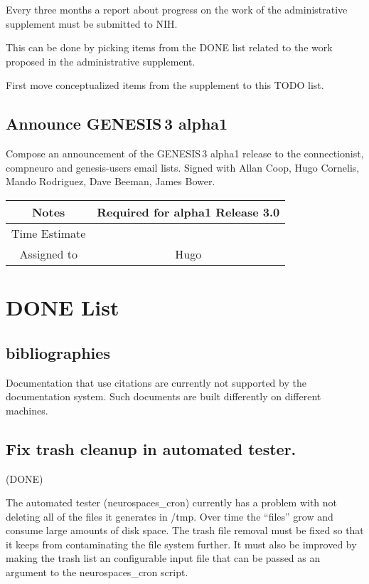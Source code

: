 \documentclass[12pt]{article}
\begin{document}
Every three months a report about progress on the work of the
administrative supplement must be submitted to NIH.

This can be done by picking items from the DONE list related to the
work proposed in the administrative supplement.

First move conceptualized items from the supplement to this TODO list.


\subsection{Announce GENESIS\,3 alpha1}

Compose an announcement of the GENESIS\,3 alpha1 release to the
connectionist, compneuro and genesis-users email lists.  Signed with
Allan Coop, Hugo Cornelis, Mando Rodriguez, Dave Beeman, James Bower.

{
  \vspace{5mm}
  \centering
  \begin{tabular}{|c|c|}
    \hline
    Notes
    & Required for alpha1 Release 3.0 \\
    \hline
    Time Estimate
    & \\
    \hline
    Assigned to
    & Hugo \\
    \hline
  \end{tabular}
}


\section{DONE List}

\subsection{bibliographies}

Documentation that use citations are currently not supported by the
documentation system.  Such documents are built differently on
different machines.


\subsection{Fix trash cleanup in automated tester.} (DONE)

The automated tester (neurospaces\_cron) currently has a problem with
not deleting all of the files it generates in /tmp. Over time the
``files'' grow and consume large amounts of disk space. The trash file
removal must be fixed so that it keeps from contaminating the file
system further. It must also be improved by making the trash list an
configurable input file that can be passed as an argument to the
neurospaces\_cron script.
\end{document}
